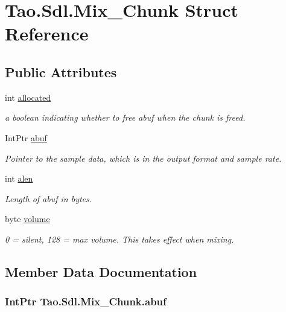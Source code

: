 \hypertarget{struct_tao_1_1_sdl_1_1_mix___chunk}{
\section{Tao.Sdl.Mix\_\-Chunk Struct Reference}
\label{struct_tao_1_1_sdl_1_1_mix___chunk}
}
\subsection*{Public Attributes}
\begin{DoxyCompactItemize}
\item 
int \hyperlink{struct_tao_1_1_sdl_1_1_mix___chunk_a309fd05e984280194e82869ab43f26c4}{allocated}
\begin{DoxyCompactList}\small\item\em a boolean indicating whether to free abuf when the chunk is freed. \item\end{DoxyCompactList}\item 
IntPtr \hyperlink{struct_tao_1_1_sdl_1_1_mix___chunk_abc6a12eeb8e476ea2c178cbfc088ba3c}{abuf}
\begin{DoxyCompactList}\small\item\em Pointer to the sample data, which is in the output format and sample rate. \item\end{DoxyCompactList}\item 
int \hyperlink{struct_tao_1_1_sdl_1_1_mix___chunk_a0bdd5e8412efa97d4dbc738895fb0ffc}{alen}
\begin{DoxyCompactList}\small\item\em Length of abuf in bytes. \item\end{DoxyCompactList}\item 
byte \hyperlink{struct_tao_1_1_sdl_1_1_mix___chunk_a1c9afa49eba69be215d4ce2cfebb982a}{volume}
\begin{DoxyCompactList}\small\item\em 0 = silent, 128 = max volume. This takes effect when mixing. \item\end{DoxyCompactList}\end{DoxyCompactItemize}


\subsection{Member Data Documentation}
\hypertarget{struct_tao_1_1_sdl_1_1_mix___chunk_abc6a12eeb8e476ea2c178cbfc088ba3c}{
\subsubsection[{abuf}]{\setlength{\rightskip}{0pt plus 5cm}IntPtr {\bf Tao.Sdl.Mix\_\-Chunk.abuf}}}
\label{struct_tao_1_1_sdl_1_1_mix___chunk_abc6a12eeb8e476ea2c178cbfc088ba3c}


